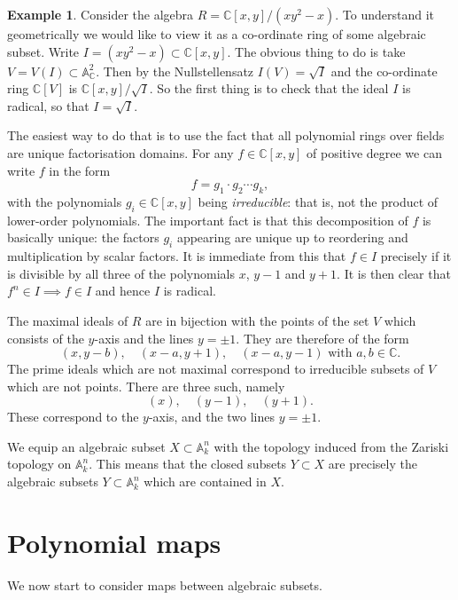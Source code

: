 \documentclass [12pt,oneside,a4paper,mathscr]{amsart}
\theoremstyle{definition}
\newtheorem{example}[thm]{Example}
\newcommand {\A}{\mathbb A}
\newcommand {\C}{\mathbb C}
\begin{document}
\begin{example}
Consider the algebra $R=\C[x,y]/(xy^2-x)$. To understand it geometrically we would like to view it as a co-ordinate ring of some algebraic subset. Write $I=(xy^2-x)\subset \C[x,y]$. The obvious thing to do is take $V=V(I)\subset \A^2_\C$. Then by the Nullstellensatz $I(V)=\sqrt{I}$ and the co-ordinate ring $\C[V]$ is $\C[x,y]/\sqrt{I}$. So the first thing is to check that the ideal $I$ is radical, so that $I=\sqrt{I}$.

The easiest way to do that is to use the fact that all polynomial rings over fields are unique factorisation domains. For any $f\in \C[x,y]$ of positive degree we can write $f$  in the form
\[f=g_1\cdot g_2 \cdots g_k,\]
with  the polynomials $g_i\in \C[x,y]$ being \emph{irreducible}: that is, not the product of lower-order polynomials. The important fact is that  this decomposition of $f$ is basically unique: the factors $g_i$ appearing are unique up to reordering and multiplication by scalar factors.
It is immediate from this  that $f\in I$ precisely if it is divisible by all three of  the polynomials $x$, $y-1$ and $y+1$. It is then clear that $f^n\in I \implies f\in I$ and hence $I$ is radical. 

The maximal ideals of $R$ are in bijection with the points of the set $V$ which consists of the $y$-axis and the lines $y=\pm 1$. They are therefore of the form
\[(x,y-b), \quad (x-a,y+1), \quad (x-a,y-1) \text{ with } a,b\in \C.\]
The prime ideals which are not maximal correspond to irreducible subsets of $V$ which are not points. There are three such, namely
\[(x), \quad (y-1), \quad (y+1).\] 
These correspond to the $y$-axis, and the two lines $y=\pm 1$.
\end{example}

We equip an algebraic subset $X\subset \A^n_k$ with the  topology induced from the Zariski topology on $\A^n_k$. This means that the closed subsets $Y\subset X$ are precisely the algebraic subsets $Y\subset \A^n_k$ which are contained in $X$. 





\section{Polynomial maps}

We now start to consider maps between algebraic subsets.
\end{document}
